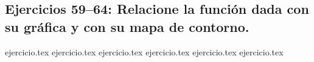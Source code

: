 \subsection*{Ejercicios 59--64: Relacione la función dada con su gráfica y con su mapa de contorno.}
\begin{enumerate}
    \setcounter{enumi}{58}
    {ejercicio.tex}
    {ejercicio.tex}
    {ejercicio.tex}
    {ejercicio.tex}
    {ejercicio.tex}
    {ejercicio.tex}
\end{enumerate}
